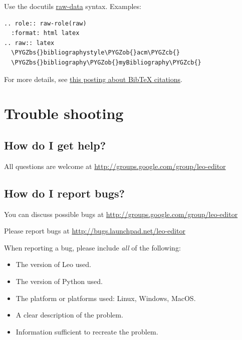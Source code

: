 \documentclass[a4paper,10pt,english]{sphinxmanual}
\def\PYGZbs{\char`\\}
\def\PYGZob{\char`\{}
\def\PYGZcb{\char`\}}
\begin{document}
Use the docutils \href{http://docutils.sourceforge.net/docs/ref/rst/directives.html\#raw-data-pass-through}{raw-data} syntax. Examples:

\begin{Verbatim}[commandchars=\\\{\}]
.. role:: raw-role(raw)
  :format: html latex
.. raw:: latex
  \PYGZbs{}bibliographystyle\PYGZob{}acm\PYGZcb{}
  \PYGZbs{}bibliography\PYGZob{}myBibliography\PYGZcb{}
\end{Verbatim}

For more details, see \href{http://groups.google.com/group/leo-editor/browse\_thread/thread/d36d76174dcd6786/9c2a298049f4f01c}{this posting about BibTeX citations}.


\section{Trouble shooting}
\label{FAQ:trouble-shooting}

\subsection{How do I get help?}
\label{FAQ:how-do-i-get-help}
All questions are welcome at \href{http://groups.google.com/group/leo-editor}{http://groups.google.com/group/leo-editor}


\subsection{How do I report bugs?}
\label{FAQ:how-do-i-report-bugs}
You can discuss possible bugs at
\href{http://groups.google.com/group/leo-editor}{http://groups.google.com/group/leo-editor}

Please report bugs at
\href{http://bugs.launchpad.net/leo-editor}{http://bugs.launchpad.net/leo-editor}

When reporting a bug, please include \emph{all} of the following:
\begin{itemize}
\item {} 
The version of Leo used.

\item {} 
The version of Python used.

\item {} 
The platform or platforms used: Linux, Windows, MacOS.

\item {} 
A clear description of the problem.

\item {} 
Information sufficient to recreate the problem.

\end{itemize}
\end{document}
